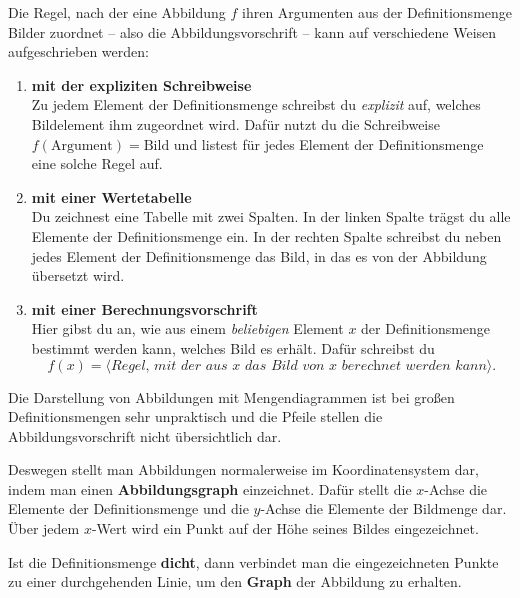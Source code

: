 \documentclass[solution]{uebungsblatt}
\begin{document}
\begin{remark}{}
Die Regel, nach der eine Abbildung $f$ ihren Argumenten aus der Definitionsmenge Bilder zuordnet -- also die Abbildungsvorschrift -- kann auf verschiedene Weisen aufgeschrieben werden:
\begin{enumerate}[label=\textbf{(\arabic*)}]
    \item \textbf{mit der expliziten Schreibweise}\\
        \sloppy
        Zu jedem Element der Definitionsmenge schreibst du \emph{explizit} auf, welches Bildelement ihm zugeordnet wird. Dafür nutzt du die Schreibweise \mbox{$f(\text{Argument})=\text{Bild}$} und listest für jedes Element der Definitionsmenge eine solche Regel auf.
    
        \fussy
    \item \textbf{mit einer Wertetabelle}\\
        Du zeichnest eine Tabelle mit zwei Spalten. In der linken Spalte trägst du alle Elemente der Definitionsmenge ein. In der rechten Spalte schreibst du neben jedes Element der Definitionsmenge das Bild, in das es von der Abbildung übersetzt wird.
    
    \item \textbf{mit einer Berechnungsvorschrift}\\
        Hier gibst du an, wie aus einem \emph{beliebigen} Element $x$ der Definitionsmenge bestimmt werden kann, welches Bild es erhält. Dafür schreibst du
        \[f(x)=\langle\textit{Regel, mit der aus $x$ das Bild von $x$ berechnet werden kann}\rangle.\]
\end{enumerate} 
\end{remark}

\begin{remark}{}

Die Darstellung von Abbildungen mit Mengendiagrammen ist bei großen Definitionsmengen sehr unpraktisch und die Pfeile stellen die Abbildungsvorschrift nicht übersichtlich dar.

Deswegen stellt man Abbildungen normalerweise im Koordinatensystem dar, indem man einen \textbf{Abbildungsgraph} einzeichnet. Dafür stellt die $x$-Achse die Elemente der Definitionsmenge und die $y$-Achse die Elemente der Bildmenge dar. Über jedem $x$-Wert wird ein Punkt auf der Höhe seines Bildes eingezeichnet. 

Ist die Definitionsmenge \textbf{dicht}, dann verbindet man die eingezeichneten Punkte zu einer durchgehenden Linie, um den \textbf{Graph} der Abbildung zu erhalten.
\end{remark}
\end{document}
